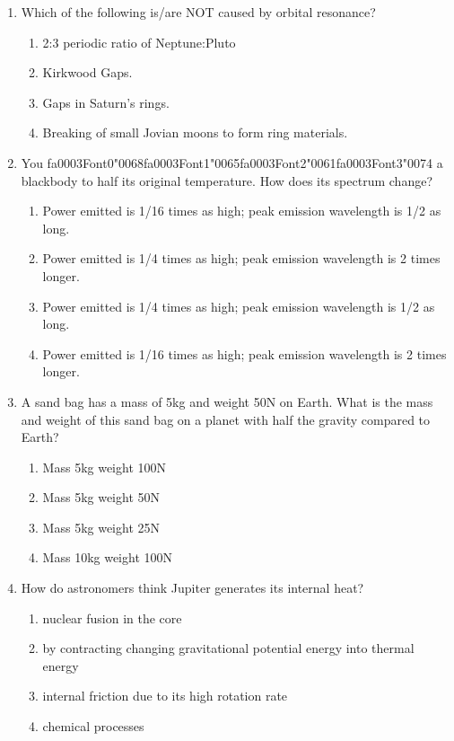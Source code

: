 \documentclass[12pt]{article}
\begin{document}
\begin{enumerate}[label=\arabic*.]
\begin{enumerate}[label=(\alph*)]
\end{enumerate}
\item Which of the following is/are NOT caused by orbital resonance?
\begin{enumerate}[label=(\alph*)]
    \item 2:3 periodic ratio of Neptune:Pluto
    \item Kirkwood Gaps.
    \item Gaps in Saturn's rings.
    \item Breaking of small Jovian moons to form ring materials.
\end{enumerate}
\item You {\csname fa0003Font0\endcsname\char"0068}{\csname fa0003Font1\endcsname\char"0065}{\csname fa0003Font2\endcsname\char"0061}{\csname fa0003Font3\endcsname\char"0074} a blackbody to half its original temperature. How does its spectrum change?
\begin{enumerate}[label=(\alph*)]
    \item Power emitted is 1/16 times as high; peak emission wavelength is 1/2 as long.
    \item Power emitted is 1/4 times as high; peak emission wavelength is 2 times longer.
    \item Power emitted is 1/4 times as high; peak emission wavelength is 1/2 as long.
    \item Power emitted is 1/16 times as high; peak emission wavelength is 2 times longer.
\end{enumerate}
\item A sand bag has a mass of 5kg and weight 50N on Earth. What is the mass and weight of this
sand bag on a planet with half the gravity compared to Earth?
\begin{enumerate}[label=(\alph*)]
    \item Mass 5kg weight 100N
    \item Mass 5kg weight 50N
    \item Mass 5kg weight 25N
    \item Mass 10kg weight 100N
\end{enumerate}
\item How do astronomers think Jupiter generates its internal heat?
\begin{enumerate}[label=(\alph*)]
    \item nuclear fusion in the core
    \item by contracting changing gravitational potential energy into thermal energy
    \item internal friction due to its high rotation rate
    \item chemical processes
\end{enumerate}
\end{enumerate}
\end{document}
